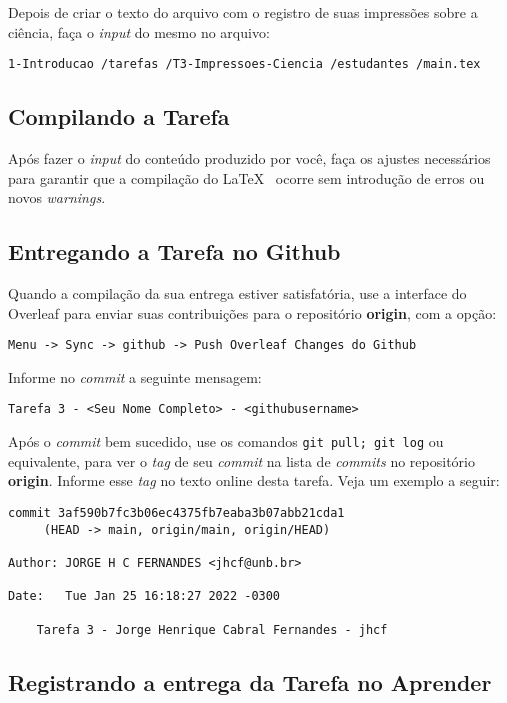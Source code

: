 Depois de criar o texto do arquivo com o registro de suas impressões sobre a ciência, faça o \textit{input} do mesmo no arquivo:
\begin{verbatim}
1-Introducao /tarefas /T3-Impressoes-Ciencia /estudantes /main.tex
\end{verbatim}

\subsection{Compilando a Tarefa}

Após fazer o \textit{input} do conteúdo produzido por você, faça os ajustes necessários para garantir que a compilação do \LaTeX~ ocorre sem introdução de erros ou novos \textit{warnings}.

\subsection{Entregando a Tarefa no Github}

Quando a compilação da sua entrega estiver satisfatória, use a interface do Overleaf para enviar suas contribuições para o repositório \textbf{origin}, com a opção:

\begin{verbatim}
Menu -> Sync -> github -> Push Overleaf Changes do Github
\end{verbatim}

Informe no \textit{commit} a seguinte mensagem: 
\begin{verbatim}
Tarefa 3 - <Seu Nome Completo> - <githubusername>
\end{verbatim}

Após o \textit{commit} bem sucedido, use os comandos \verb|git pull; git log| ou equivalente, para ver o \textit{tag} de seu \textit{commit} na lista de \textit{commits} no repositório \textbf{origin}. Informe esse \textit{tag} no texto online desta tarefa. 
Veja um exemplo a seguir:

\begin{verbatim}
commit 3af590b7fc3b06ec4375fb7eaba3b07abb21cda1 
     (HEAD -> main, origin/main, origin/HEAD)

Author: JORGE H C FERNANDES <jhcf@unb.br>

Date:   Tue Jan 25 16:18:27 2022 -0300

    Tarefa 3 - Jorge Henrique Cabral Fernandes - jhcf
\end{verbatim}

\subsection{Registrando a entrega da Tarefa no Aprender}

